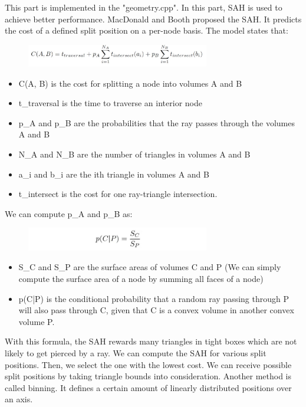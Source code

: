 \documentclass[acmtog]{acmart}
\begin{document}
\quad This part is implemented in the "geometry.cpp". In this part, SAH is used to achieve better performance.
MacDonald and Booth proposed the SAH. It predicts the cost of a defined split position on a per-node basis. 
The model states that:
\begin{figure}[h]
	\centering
	{\includegraphics[width=8cm]{sah1.JPG}}	
\end{figure}
\begin{itemize}
	\item C(A, B) is the cost for splitting a node into volumes A and B
	\item t\_traversal is the time to traverse an interior node
	\item p\_A and p\_B are the probabilities that the ray passes through the volumes A and B
	\item N\_A and N\_B are the number of triangles in volumes A and B
	\item a\_i and b\_i are the ith triangle in volumes A and B
	\item t\_intersect is the cost for one ray-triangle intersection.
\end{itemize}
We can compute p\_A and p\_B as:
\begin{figure}[h]
	\centering
	{\includegraphics[width=8cm]{sah2.JPG}}	
\end{figure}

\begin{itemize}
\item S\_C and S\_P are the surface areas of volumes C and P (We can simply compute the surface area of a node by summing all faces of a node)
\item p(C|P) is the conditional probability that a random ray passing through P will also pass through C, given that C is a convex volume in another convex volume P.
\end{itemize}

With this formula, the SAH rewards many triangles in tight boxes which are not likely to get pierced by a ray.
We can compute the SAH for various split positions. Then, we select the one with the lowest cost. We can receive possible split positions by taking triangle bounds into consideration. Another method is called binning. It defines a certain amount of linearly distributed positions over an axis. 
\end{document}
